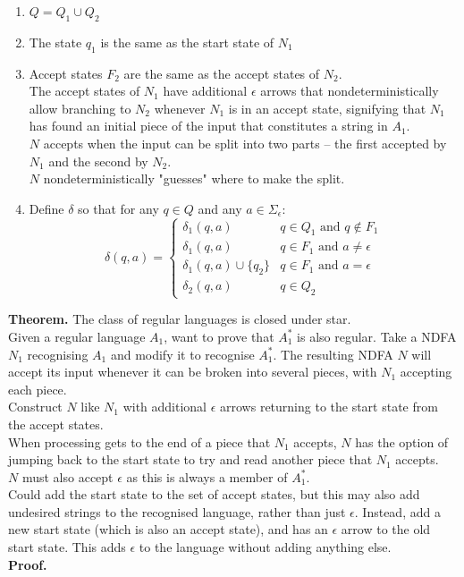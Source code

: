 \documentclass{article}
\begin{document}
\begin{enumerate}
	\item $Q = Q_1 \cup Q_2$
	\item The state $q_1$ is the same as the start state of $N_1$
	\item Accept states $F_2$ are the same as the accept states of $N_2$.
	\\ The accept states of $N_1$ have additional $\epsilon$ arrows that nondeterministically allow branching to $N_2$ whenever $N_1$ is in an accept state, signifying that $N_1$ has found an initial piece of the input that constitutes a string in $A_1$.
	\\ $N$ accepts when the input can be split into two parts -- the first accepted by $N_1$ and the second by $N_2$.
	\\ $N$ nondeterministically "guesses" where to make the split.
	\item Define $\delta$ so that for any $q \in Q$ and any $a \in \Sigma_{\epsilon}$:
	\begin{equation*}
		\delta(q, a) = \begin{cases}
		\delta_1(q, a) & q \in Q_1 \text{ and } q \notin F_1\\
		\delta_1(q, a) & q \in F_1 \text{ and } a \neq \epsilon\\
		\delta_1(q, a) \cup \{q_2\} & q \in F_1 \text{ and } a = \epsilon\\
		\delta_2(q, a) & q \in Q_2 
		\end{cases}
	\end{equation*}
\end{enumerate}
\textbf{Theorem.} The class of regular languages is closed under star.\medskip
\\ Given a regular language $A_1$, want to prove that $A_1^*$ is also regular. Take a NDFA $N_1$ recognising $A_1$ and modify it to recognise $A_1^*$. The resulting NDFA $N$ will accept its input whenever it can be broken into several pieces, with $N_1$ accepting each piece.\medskip
\\ Construct $N$ like $N_1$ with additional $\epsilon$ arrows returning to the start state from the accept states.
\\ When processing gets to the end of a piece that $N_1$ accepts, $N$ has the option of jumping back to the start state to try and read another piece that $N_1$ accepts.
\\ $N$ must also accept $\epsilon$ as this is always a member of $A_1^*$.\medskip
\\ Could add the start state to the set of accept states, but this may also add undesired strings to the recognised language, rather than just $\epsilon$. Instead, add a new start state (which is also an accept state), and has an $\epsilon$ arrow to the old start state. This adds $\epsilon$ to the language without adding anything else.\medskip
\\\textbf{Proof.}
\end{document}
